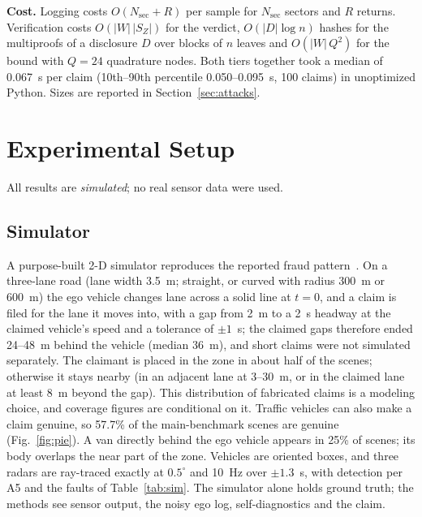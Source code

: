 



\textbf{Cost.} Logging costs $O(N_{\mathrm{sec}} + R)$ per sample for $N_{\mathrm{sec}}$ sectors and $R$ returns. Verification costs $O(|W|\,|S_Z|)$ for the verdict, $O(|D| \log n)$ hashes for the multiproofs of a disclosure $D$ over blocks of $n$ leaves and $O(|W|\,Q^2)$ for the bound with $Q = 24$ quadrature nodes. Both tiers together took a median of 0.067~s per claim (10th--90th percentile 0.050--0.095~s, 100 claims) in unoptimized Python. Sizes are reported in Section~\ref{sec:attacks}.

\section{Experimental Setup}\label{sec:setup}

All results are \emph{simulated}; no real sensor data were used.

\subsection{Simulator}
A purpose-built 2-D simulator reproduces the reported fraud pattern~\cite{b1,b2,b3}. On a three-lane road (lane width 3.5~m; straight, or curved with radius 300~m or 600~m) the ego vehicle changes lane across a solid line at $t = 0$, and a claim is filed for the lane it moves into, with a gap from 2~m to a 2~s headway at the claimed vehicle's speed and a tolerance of $\pm 1$~s; the claimed gaps therefore ended 24--48~m behind the vehicle (median 36~m), and short claims were not simulated separately. The claimant is placed in the zone in about half of the scenes; otherwise it stays nearby (in an adjacent lane at 3--30~m, or in the claimed lane at least 8~m beyond the gap). This distribution of fabricated claims is a modeling choice, and coverage figures are conditional on it. Traffic vehicles can also make a claim genuine, so 57.7\% of the main-benchmark scenes are genuine (Fig.~\ref{fig:pie}). A van directly behind the ego vehicle appears in 25\% of scenes; its body overlaps the near part of the zone. Vehicles are oriented boxes, and three radars are ray-traced exactly at $0.5^\circ$ and 10~Hz over $\pm 1.3$~s, with detection per A5 and the faults of Table~\ref{tab:sim}. The simulator alone holds ground truth; the methods see sensor output, the noisy ego log, self-diagnostics and the claim.

